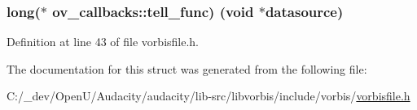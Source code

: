 \subsubsection[{\texorpdfstring{tell\+\_\+func}{tell_func}}]{\setlength{\rightskip}{0pt plus 5cm}long($\ast$ ov\+\_\+callbacks\+::tell\+\_\+func) ({\bf void} $\ast$datasource)}\hypertarget{structov__callbacks_ab078f3f386b7c58e9fab2ede904e0e36}{}\label{structov__callbacks_ab078f3f386b7c58e9fab2ede904e0e36}


Definition at line 43 of file vorbisfile.\+h.



The documentation for this struct was generated from the following file\+:\begin{DoxyCompactItemize}
\item 
C\+:/\+\_\+dev/\+Open\+U/\+Audacity/audacity/lib-\/src/libvorbis/include/vorbis/\hyperlink{vorbisfile_8h}{vorbisfile.\+h}\end{DoxyCompactItemize}
